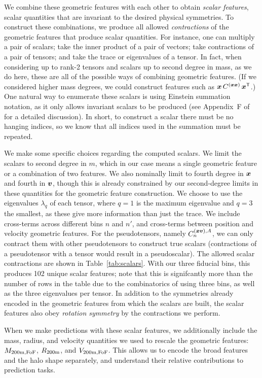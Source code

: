 We combine these geometric features with each other to obtain \emph{scalar features}, scalar quantities that are invariant to the desired physical symmetries.
To construct these combinations, we produce all allowed \emph{contractions} of the geometric features that produce scalar quantities.
For instance, one can multiply a pair of scalars; take the inner product of a pair of vectors; take contractions of a pair of tensors; and take the trace or eigenvalues of a tensor.
In fact, when considering up to rank-2 tensors and scalars up to second degree in mass, as we do here, these are all of the possible ways of combining geometric features.
(If we considered higher mass degrees, we could construct features such as $\bm{x} \, C^{(\bm{x}\bm{x})} \, \bm{x}^{\mathsf{T}}$.)
One natural way to enumerate these scalars is using Einstein summation notation, as it only allows invariant scalars to be produced (see Appendix~F of \citealt{Villar2021a} for a detailed discussion).
In short, to construct a scalar there must be no hanging indices, so we know that all indices used in the summation must be repeated.

We make some specific choices regarding the computed scalars.
We limit the scalars to second degree in $m$, which in our case means a single geometric feature or a combination of two features.
We also nominally limit to fourth degree in $\bm{x}$ and fourth in $\bm{v}$, though this is already constrained by our second-degree limits in these quantities for the geometric feature construction.
We choose to use the eigenvalues $\lambda_q$ of each tensor, where $q=1$ is the maximum eigenvalue and $q=3$ the smallest, as these give more information than just the trace.
We include cross-terms across different bins $n$ and $n'$, and cross-terms between position and velocity geometric features.
For the pseudotensors, namely $C^{(\bm{x}\bm{v}),A}_n$, we can only contract them with other pseudotensors to construct true scalars (contractions of a pseudotensor with a tensor would result in a pseudoscalar).
The allowed scalar contractions are shown in Table~\ref{tab:scalars}.
With our three fiducial bins, this produces 102 unique scalar features; note that this is signifcantly more than the number of rows in the table due to the combinatorics of using three bins, as well as the three eigenvalues per tensor.
In addition to the symmetries already encoded in the geometric features from which the scalars are built, the scalar features also obey \emph{rotation symmetry} by the contractions we perform.

When we make predictions with these scalar features, we additionally include the mass, radius, and velocity quantities we used to rescale the geometric features: $M_\mathrm{200m,FoF}$, $R_\mathrm{200m}$, and $V_\mathrm{200m,FoF}$. 
This allows us to encode the broad features and the halo shape separately, and understand their relative contributions to prediction tasks.

